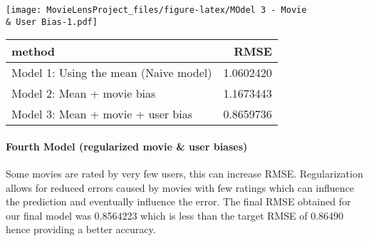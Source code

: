\documentclass[
]{article}
\newenvironment{Shaded}{\begin{snugshade}}{\end{snugshade}}
\newcommand{\AttributeTok}[1]{\textcolor[rgb]{0.77,0.63,0.00}{#1}}
\newcommand{\FunctionTok}[1]{\textcolor[rgb]{0.00,0.00,0.00}{#1}}
\newcommand{\NormalTok}[1]{#1}
\newcommand{\OtherTok}[1]{\textcolor[rgb]{0.56,0.35,0.01}{#1}}
\newcommand{\SpecialCharTok}[1]{\textcolor[rgb]{0.00,0.00,0.00}{#1}}
\newcommand{\StringTok}[1]{\textcolor[rgb]{0.31,0.60,0.02}{#1}}
\begin{document}
\texttt{[image: MovieLensProject\_files/figure-latex/MOdel 3 - Movie \\\& User Bias-1.pdf]}

\begin{Shaded}
\end{Shaded}

\begin{longtable}[]{@{}lr@{}}
\toprule
method & RMSE \\
\midrule
\endhead
Model 1: Using the mean (Naive model) & 1.0602420 \\
Model 2: Mean + movie bias & 1.1673443 \\
Model 3: Mean + movie + user bias & 0.8659736 \\
\bottomrule
\end{longtable}

\hypertarget{fourth-model-regularized-movie-user-biases}{%
\paragraph{Fourth Model (regularized movie \& user
biases)}\label{fourth-model-regularized-movie-user-biases}}

Some movies are rated by very few users, this can increase RMSE.
Regularization allows for reduced errors caused by movies with few
ratings which can influence the prediction and eventually influence the
error. The final RMSE obtained for our final model was 0.8564223 which
is less than the target RMSE of 0.86490 hence providing a better
accuracy.
\end{document}
